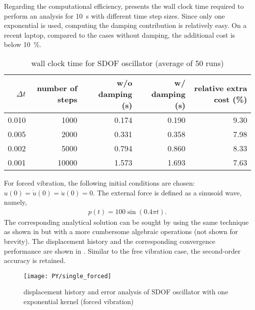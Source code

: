 Regarding the computational efficiency,  presents the wall clock time required to perform an analysis for \SI{10}{\second} with different time step sizes.
Since only one exponential is used, computing the damping contribution is relatively easy. On a recent laptop, compared to the cases without damping, the additional cost is below \SI{10}{\percent}.
\begin{table}[H]
\centering\footnotesize
\caption{wall clock time for SDOF oscillator (average of \num{50} runs)}\label{tab:sdof_cost}
\begin{tabular}{rrrrr}
    \toprule
    $\Delta{}t$ & number of steps & w/o damping (\si{\second}) & w/ damping (\si{\second}) & relative extra cost (\%) \\ \midrule
    \num{0.010} &      \num{1000} &                \num{0.174} &               \num{0.190} &               \num{9.30} \\
    \num{0.005} &      \num{2000} &                \num{0.331} &               \num{0.358} &               \num{7.98} \\
    \num{0.002} &      \num{5000} &                \num{0.794} &               \num{0.860} &               \num{8.33} \\
    \num{0.001} &     \num{10000} &                \num{1.573} &               \num{1.693} &               \num{7.63} \\ \bottomrule
\end{tabular}
\end{table}

For forced vibration, the following initial conditions are chosen: $u\left(0\right)=\dot{u}\left(0\right)=\ddot{u}\left(0\right)=0$. The external force is defined as a sinusoid wave, namely,
\begin{gather}
p\left(t\right)=100\sin\left(0.4\pi{}t\right).
\end{gather}
The corresponding analytical solution can be sought by using the same technique as shown in  but with a more cumbersome algebraic operations (not shown for brevity). The displacement history and the corresponding convergence performance are shown in . Similar to the free vibration case, the second-order accuracy is retained.
\begin{figure}[H]
\centering
\texttt{[image: PY/single\_forced]}
\caption{displacement history and error analysis of SDOF oscillator with one exponential kernel (forced vibration)}\label{fig:sdof_forced}
\end{figure}

